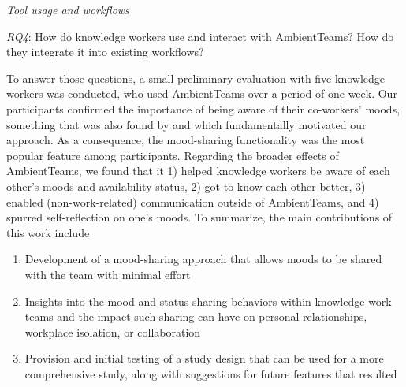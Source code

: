 \setlength{\leftskip}{0pt}

\medskip\noindent\textit{Tool usage and workflows}

\smallskip\noindent\textit{RQ4}: How do knowledge workers use and interact with AmbientTeams? How do they integrate it into existing workflows?

\bigskip\noindent To answer those questions, a small preliminary evaluation with five knowledge workers was conducted, who used AmbientTeams over a period of one week. Our participants confirmed the importance of being aware of their co-workers' moods, something that was also found by \textcite{garcia1999emotional, dullemond2013fixing} and which fundamentally motivated our approach. As a consequence, the mood-sharing functionality was the most popular feature among participants. Regarding the broader effects of AmbientTeams, we found that it 1) helped knowledge workers be aware of each other's moods and availability status, 2) got to know each other better, 3) enabled (non-work-related) communication outside of AmbientTeams, and 4) spurred self-reflection on one's moods. To summarize, the main contributions of this work include

\begin{enumerate}
    \item Development of a mood-sharing approach that allows moods to be shared with the team with minimal effort
    \item Insights into the mood and status sharing behaviors within knowledge work teams and the impact such sharing can have on personal relationships, workplace isolation, or collaboration
    \item Provision and initial testing of a study design that can be used for a more comprehensive study, along with suggestions for future features that resulted
\end{enumerate}
